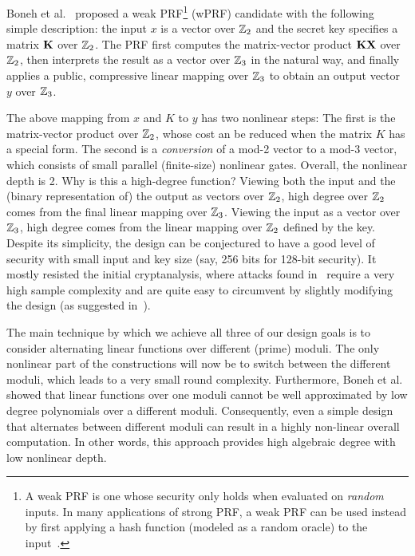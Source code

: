 Boneh et al.~\cite{boneh2018-darkmatter} proposed a weak PRF\footnote{A weak PRF is one whose security only holds when evaluated on {\em random} inputs. In many applications of strong PRF, a weak PRF can be used instead by first applying a hash function (modeled as a random oracle) to the input~\cite{someweakPRFref}.} (wPRF) candidate with the following simple description: the input $x$ is a vector over  $\mathbb{Z}_2$ and the secret key specifies a matrix $\mat{K}$ over  $\mathbb{Z}_2$. The PRF first computes the matrix-vector product $\mat{Kx}$ over  $\mathbb{Z}_2$, then interprets the result as a vector over $\mathbb{Z}_3$ in the natural way,  and finally applies a public, compressive linear mapping over $\mathbb{Z}_3$ to obtain an output vector $y$ over $\mathbb{Z}_3$.

The above mapping from $x$ and $K$ to $y$ has two nonlinear steps: The first is the matrix-vector product over $\mathbb{Z}_2$, whose cost an be reduced when the matrix $K$ has a special form. The second is a {\em conversion} of a mod-2 vector to a mod-3 vector, which consists of small parallel (finite-size) nonlinear gates.  Overall, the nonlinear depth is 2. Why is this a high-degree function? Viewing both the input and the (binary representation of) the output as vectors over $\mathbb{Z}_2$, high degree over $\mathbb{Z}_2$ comes from the final linear mapping over $\mathbb{Z}_3$. Viewing the input as a vector over $\mathbb{Z}_3$, high degree comes from the linear mapping over $\mathbb{Z}_2$ defined by the key.  Despite its simplicity, the design can be conjectured to have a good level of security with small input and key size (say, 256 bits for 128-bit security). It mostly resisted the initial cryptanalysis, where attacks found in~\cite{cheon2020-adventures} require a very high sample complexity and are quite easy to circumvent by slightly modifying the design (as suggested in~\cite{cheon2020-adventures}).

\iffalse
The main technique by which we achieve all three of our design goals is to consider alternating linear functions over different (prime) moduli. The only nonlinear part of the constructions will now be to switch between the different moduli, which leads to a very small round complexity. Furthermore, Boneh et al.~\cite{boneh2018-darkmatter} showed that linear functions over one moduli cannot be well approximated by low degree polynomials over a different moduli. Consequently, even a simple design that alternates between different moduli can result in a highly non-linear overall computation. In other words, this approach provides high algebraic degree with low nonlinear depth. 

